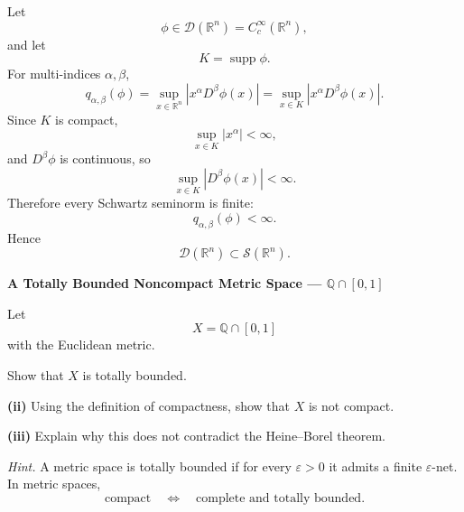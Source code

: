 \begin{solution}
Let
\[
\phi\in\mathcal D(\mathbb R^n)=C_c^\infty(\mathbb R^n),
\]
and let
\[
K=\operatorname{supp}\phi.
\]
For multi-indices \(\alpha,\beta\),
\[
q_{\alpha,\beta}(\phi)
=
\sup_{x\in\mathbb R^n}
|x^\alpha D^\beta\phi(x)|
=
\sup_{x\in K}
|x^\alpha D^\beta\phi(x)|.
\]
Since \(K\) is compact,
\[
\sup_{x\in K}|x^\alpha|<\infty,
\]
and \(D^\beta\phi\) is continuous, so
\[
\sup_{x\in K}|D^\beta\phi(x)|<\infty.
\]
Therefore every Schwartz seminorm is finite:
\[
q_{\alpha,\beta}(\phi)<\infty.
\]
Hence
\[
\boxed{
\mathcal D(\mathbb R^n)
\subset
\mathcal S(\mathbb R^n).
}
\]
\end{solution}


\begin{problem}[CP-II-0434]
\label{prob:cp-ii-0434}
\textbf{A Totally Bounded Noncompact Metric Space --- \(\mathbb Q\cap[0,1]\)}

\hspace*{1.5em}Let
\[
X=\mathbb Q\cap[0,1]
\]
with the Euclidean metric.


Show that \(X\) is totally bounded.

\par\smallskip\noindent\textbf{(ii)}\quad
Using the definition of compactness, show that \(X\) is not compact.

\par\smallskip\noindent\textbf{(iii)}\quad
Explain why this does not contradict the Heine--Borel theorem.

\medskip
\noindent\emph{Hint.} A metric space is totally bounded if for every \(\varepsilon>0\) it admits a
finite \(\varepsilon\)-net. In metric spaces,
\[
\text{compact}
\quad\Longleftrightarrow\quad
\text{complete and totally bounded}.
\]
\end{problem}

